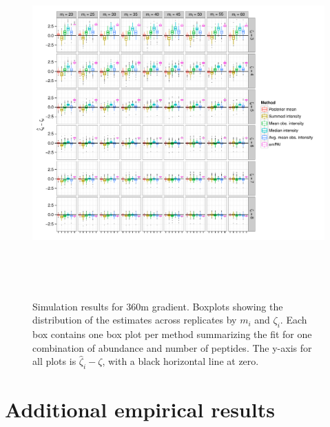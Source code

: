 \begin{figure}
\centering
\includegraphics[height=5.25in, page=3]{figures/proteomics/figures_boxplot_sim}
\caption{Simulation results for 360m gradient.
Boxplots showing the distribution of the estimates across replicates by $m_i$ and $\zeta_i$.
Each box contains one box plot per method summarizing the fit for one combination of abundance and number of peptides.
The y-axis for all plots is $\hat{\zeta}_i - \zeta$, with a black horizontal line at zero.}
\end{figure}


\clearpage

\section{Additional empirical results}

